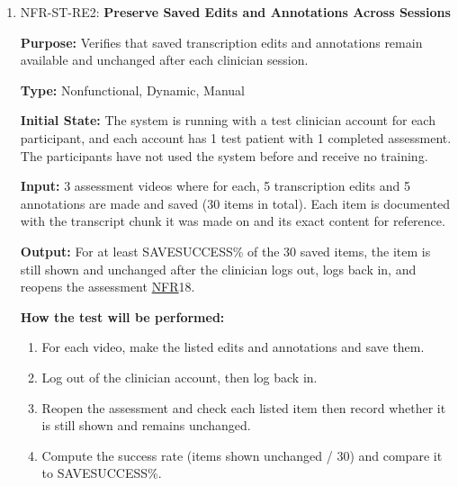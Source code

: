 \documentclass[12pt, titlepage]{article}
\newcommand{\srsnfr}[1]{\href{https://github.com/Nour-Fawaz/MacaBoca/blob/main/pdfs/SRS/SRS.pdf}{NFR}}
\renewcommand{\_}{\oldunderscore\allowbreak}
\begin{document}
\begin{enumerate}
\item NFR-ST-RE2: \textbf{Preserve Saved Edits and Annotations Across Sessions\\}
  \begin{mdframed}[linewidth=0.5mm]
      \textbf{Purpose:} Verifies that saved transcription edits and annotations remain available and unchanged after each clinician session. \par
      \textbf{Type:} Nonfunctional, Dynamic, Manual \par
      \textbf{Initial State:} The system is running with a test clinician account for each participant, and each account has 1 test patient with 1 completed assessment. The participants have not used the system before and receive no training. \par
      \textbf{Input:} 3 assessment videos where for each, 5 transcription edits and 5 annotations are made and saved (30 items in total). Each item is documented with the transcript chunk it was made on and its exact content for reference. \par
      \textbf{Output:} For at least SAVE\_SUCCESS\% of the 30 saved items, the item is still shown and unchanged after the clinician logs out, logs back in, and reopens the assessment \srsnfr*{18}. \par
      \textbf{How the test will be performed:}
      \begin{enumerate}
        \item[1.] For each video, make the listed edits and annotations and save them.
        \item[2.] Log out of the clinician account, then log back in.
        \item[3.] Reopen the assessment and check each listed item then record whether it is still shown and remains unchanged.
        \item[4.] Compute the success rate (items shown unchanged / 30) and compare it to SAVE\_SUCCESS\%.

      \end{enumerate}
  \end{mdframed}
\end{enumerate}
\end{document}
